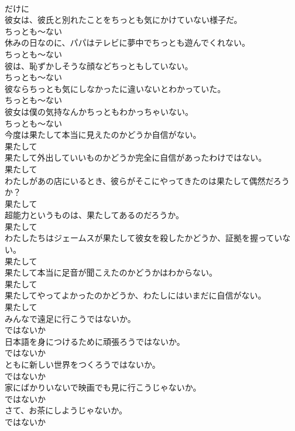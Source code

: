 \documentclass[8pt]{extreport}
\begin{document}
\begin{CJK}{UTF8}{min}
\\	だけに	
\\	彼女は、彼氏と別れたことをちっとも気にかけていない様子だ。	
\\	ちっとも～ない	
\\	休みの日なのに、パパはテレビに夢中でちっとも遊んでくれない。	
\\	ちっとも～ない	
\\	彼は、恥ずかしそうな顔などちっともしていない。	
\\	ちっとも～ない	
\\	彼ならちっとも気にしなかったに違いないとわかっていた。	
\\	ちっとも～ない	
\\	彼女は僕の気持なんかちっともわかっちゃいない。	
\\	ちっとも～ない	
\\	今度は果たして本当に見えたのかどうか自信がない。	
\\	果たして	
\\	果たして外出していいものかどうか完全に自信があったわけではない。	
\\	果たして	
\\	わたしがあの店にいるとき、彼らがそこにやってきたのは果たして偶然だろうか？	
\\	果たして	
\\	超能力というものは、果たしてあるのだろうか。	
\\	果たして	
\\	わたしたちはジェームスが果たして彼女を殺したかどうか、証拠を握っていない。	
\\	果たして	
\\	果たして本当に足音が聞こえたのかどうかはわからない。	
\\	果たして	
\\	果たしてやってよかったのかどうか、わたしにはいまだに自信がない。	
\\	果たして	
\\	みんなで遠足に行こうではないか。	
\\	ではないか	
\\	日本語を身につけるために頑張ろうではないか。	
\\	ではないか	
\\	ともに新しい世界をつくろうではないか。	
\\	ではないか	
\\	家にばかりいないで映画でも見に行こうじゃないか。	
\\	ではないか	
\\	さて、お茶にしようじゃないか。	
\\	ではないか	

\end{CJK}
\end{document}
